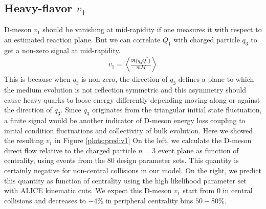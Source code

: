 \documentclass[aps, prc, reprint, amsmath, groupedaddress, nofootinbib]{revtex4-1}
\begin{document}
\subsection{Heavy-flavor $v_1$}
D-meson $v_1$ should be vanishing at mid-rapidity if one measures it with respect to an estimated reaction plane.
But we can correlate $Q_1$ with charged particle $q_3$ to get a non-zero signal at mid-rapidity.
\begin{eqnarray}
v_1 = \left\langle \frac{\Re\{q_3 Q_1^*\}}{mM} \right\rangle
\end{eqnarray}
This is because when $q_3$ is non-zero, the direction of $q_3$ defines a plane to which the medium evolution is not reflection symmetric and this asymmetry should cause heavy quarks to loose energy differently depending moving along or against the direction of $q_3$.
Since $q_3$ originates from the triangular initial state fluctuation, a finite signal would be another indicator of D-meson energy loss coupling to initial condition fluctuations and collectivity of bulk evolution.
Here we showed the resulting $v_1$ in Figure \ref{plots:pred:v1}
On the left, we calculate the D-meson direct flow relative to the charged particle $n=3$ event plane as function of centrality, using events from the 80 design parameter sets.
This quantity is certainly negative for non-central collisions in our model.
On the right, we predict this quantity as function of centrality using the high likelihood parameter set with ALICE kinematic cuts.
We expect this D-meson $v_1$ start from 0 in central collisions and decreases to $-4\%$ in peripheral centrality bins $50-80\%$.
\end{document}

